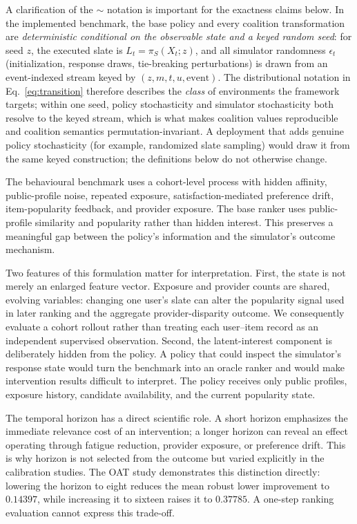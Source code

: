 \documentclass[pdflatex,sn-mathphys-num]{sn-jnl}
\theoremstyle{thmstyleone}
\theoremstyle{thmstyletwo}
\theoremstyle{thmstylethree}
\newcommand{\Policy}{\pi}
\begin{document}
A clarification of the $\sim$ notation is important for the exactness claims below. In the implemented benchmark, the base policy and every coalition transformation are \emph{deterministic conditional on the observable state and a keyed random seed}: for seed $z$, the executed slate is $L_t=\Policy_S(X_t;z)$, and all simulator randomness $\epsilon_t$ (initialization, response draws, tie-breaking perturbations) is drawn from an event-indexed stream keyed by $(z,m,t,u,\mathrm{event})$. The distributional notation in Eq.~\eqref{eq:transition} therefore describes the \emph{class} of environments the framework targets; within one seed, policy stochasticity and simulator stochasticity both resolve to the keyed stream, which is what makes coalition values reproducible and coalition semantics permutation-invariant. A deployment that adds genuine policy stochasticity (for example, randomized slate sampling) would draw it from the same keyed construction; the definitions below do not otherwise change.

The behavioural benchmark uses a cohort-level process with hidden affinity, public-profile noise, repeated exposure, satisfaction-mediated preference drift, item-popularity feedback, and provider exposure. The base ranker uses public-profile similarity and popularity rather than hidden interest. This preserves a meaningful gap between the policy's information and the simulator's outcome mechanism.

Two features of this formulation matter for interpretation. First, the state is not merely an enlarged feature vector. Exposure and provider counts are shared, evolving variables: changing one user's slate can alter the popularity signal used in later ranking and the aggregate provider-disparity outcome. We consequently evaluate a cohort rollout rather than treating each user--item record as an independent supervised observation. Second, the latent-interest component is deliberately hidden from the policy. A policy that could inspect the simulator's response state would turn the benchmark into an oracle ranker and would make intervention results difficult to interpret. The policy receives only public profiles, exposure history, candidate availability, and the current popularity state.

The temporal horizon has a direct scientific role. A short horizon emphasizes the immediate relevance cost of an intervention; a longer horizon can reveal an effect operating through fatigue reduction, provider exposure, or preference drift. This is why horizon is not selected from the outcome but varied explicitly in the calibration studies. The OAT study demonstrates this distinction directly: lowering the horizon to eight reduces the mean robust lower improvement to $0.14397$, while increasing it to sixteen raises it to $0.37785$. A one-step ranking evaluation cannot express this trade-off.
\end{document}
